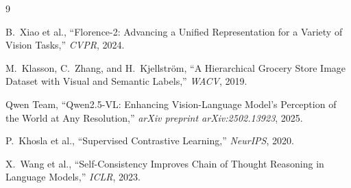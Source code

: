 \documentclass[11pt]{article}
\begin{document}
\begin{thebibliography}{9}

B.~Xiao et al.,
``Florence-2: Advancing a Unified Representation for a Variety of Vision Tasks,''
\textit{CVPR}, 2024.

M.~Klasson, C.~Zhang, and H.~Kjellstr\"om,
``A Hierarchical Grocery Store Image Dataset with Visual and Semantic Labels,''
\textit{WACV}, 2019.

Qwen Team,
``Qwen2.5-VL: Enhancing Vision-Language Model's Perception of the World at Any Resolution,''
\textit{arXiv preprint arXiv:2502.13923}, 2025.

P.~Khosla et al.,
``Supervised Contrastive Learning,''
\textit{NeurIPS}, 2020.

X.~Wang et al.,
``Self-Consistency Improves Chain of Thought Reasoning in Language Models,''
\textit{ICLR}, 2023.

\end{thebibliography}
\end{document}
